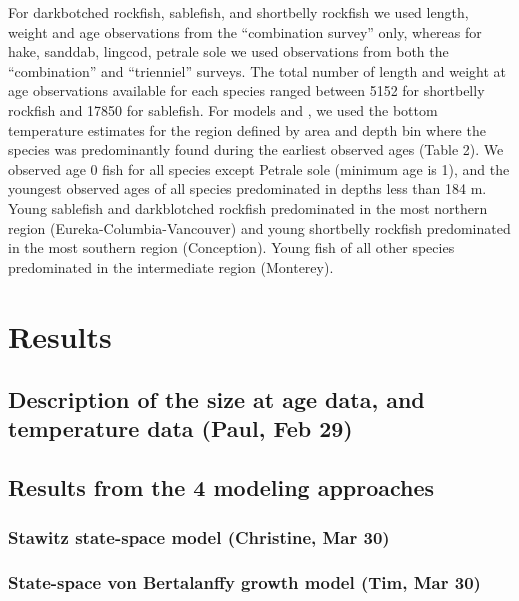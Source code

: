 \documentclass[
]{article}
\begin{document}
For darkbotched rockfish, sablefish, and shortbelly rockfish we used
length, weight and age observations from the ``combination survey''
only, whereas for hake, sanddab, lingcod, petrale sole we used
observations from both the ``combination'' and ``trienniel'' surveys.
The total number of length and weight at age observations available for
each species ranged between 5152 for shortbelly rockfish and 17850 for
sablefish. For models and , we used the bottom temperature estimates for
the region defined by area and depth bin where the species was
predominantly found during the earliest observed ages (Table 2). We
observed age 0 fish for all species except Petrale sole (minimum age is
1), and the youngest observed ages of all species predominated in depths
less than 184 m. Young sablefish and darkblotched rockfish predominated
in the most northern region (Eureka-Columbia-Vancouver) and young
shortbelly rockfish predominated in the most southern region
(Conception). Young fish of all other species predominated in the
intermediate region (Monterey).

\hypertarget{results}{%
\section{Results}\label{results}}

\hypertarget{description-of-the-size-at-age-data-and-temperature-data-paul-feb-29}{%
\subsection{Description of the size at age data, and temperature data
(Paul, Feb
29)}\label{description-of-the-size-at-age-data-and-temperature-data-paul-feb-29}}

\hypertarget{results-from-the-4-modeling-approaches}{%
\subsection{Results from the 4 modeling
approaches}\label{results-from-the-4-modeling-approaches}}

\hypertarget{stawitz-state-space-model-christine-mar-30}{%
\subsubsection{Stawitz state-space model (Christine, Mar
30)}\label{stawitz-state-space-model-christine-mar-30}}

\hypertarget{state-space-von-bertalanffy-growth-model-tim-mar-30}{%
\subsubsection{State-space von Bertalanffy growth model (Tim, Mar
30)}\label{state-space-von-bertalanffy-growth-model-tim-mar-30}}
\end{document}
